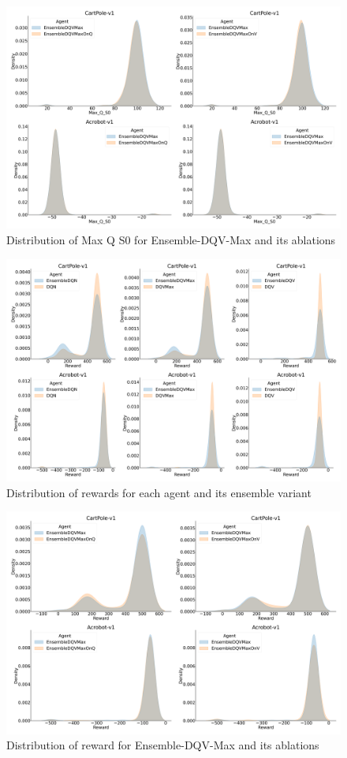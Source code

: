\begin{figure}[!tbp]
  \centering
  \includegraphics[width=.5\textwidth]{img/dqvmax_abl_qv_dist.png}
  \caption{Distribution of Max Q S0 for Ensemble-DQV-Max and its
    ablations}\label{fig:dqvmax_abl_qv_dist}
\end{figure}

\begin{figure}[!tbp]
  \centering
  \includegraphics[width=.5\textwidth]{img/all_rwd_dist.png}
  \caption{Distribution of rewards for each agent and its ensemble
    variant}\label{fig:rwd_dist}
\end{figure}

\begin{figure}[!tbp]
  \centering
  \includegraphics[width=.5\textwidth]{img/dqvmax_abl_rwd_dist.png}
  \caption{Distribution of reward for Ensemble-DQV-Max and its
    ablations}\label{fig:dqvmax_abl_rwd_dist}
\end{figure}
